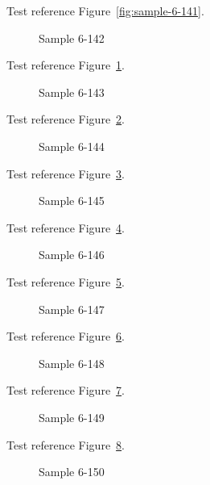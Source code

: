 Test reference Figure~\ref{fig:sample-6-141}.

\begin{figure}[tbhp]
\caption{Sample 6-142}
\label{fig:sample-6-142}
\end{figure}

Test reference Figure~\ref{fig:sample-6-142}.

\begin{figure}[tbhp]
\caption{Sample 6-143}
\label{fig:sample-6-143}
\end{figure}

Test reference Figure~\ref{fig:sample-6-143}.

\begin{figure}[tbhp]
\caption{Sample 6-144}
\label{fig:sample-6-144}
\end{figure}

Test reference Figure~\ref{fig:sample-6-144}.

\begin{figure}[tbhp]
\caption{Sample 6-145}
\label{fig:sample-6-145}
\end{figure}

Test reference Figure~\ref{fig:sample-6-145}.

\begin{figure}[tbhp]
\caption{Sample 6-146}
\label{fig:sample-6-146}
\end{figure}

Test reference Figure~\ref{fig:sample-6-146}.

\begin{figure}[tbhp]
\caption{Sample 6-147}
\label{fig:sample-6-147}
\end{figure}

Test reference Figure~\ref{fig:sample-6-147}.

\begin{figure}[tbhp]
\caption{Sample 6-148}
\label{fig:sample-6-148}
\end{figure}

Test reference Figure~\ref{fig:sample-6-148}.

\begin{figure}[tbhp]
\caption{Sample 6-149}
\label{fig:sample-6-149}
\end{figure}

Test reference Figure~\ref{fig:sample-6-149}.

\begin{figure}[tbhp]
\caption{Sample 6-150}
\label{fig:sample-6-150}
\end{figure}

